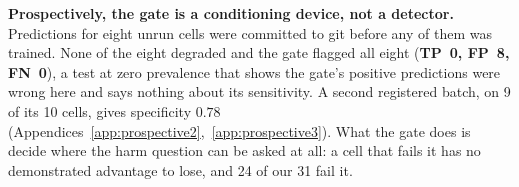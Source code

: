 \textbf{Prospectively, the gate is a conditioning device, not a detector.}
\label{sec:analysis:prospective}%
Predictions for eight unrun cells were committed to git before any of them was
trained.  None of the eight degraded and the gate flagged all eight
(\textbf{TP~0, FP~8, FN~0}), a test at zero prevalence that shows the gate's
positive predictions were wrong here and says nothing about its sensitivity.  A
second registered batch, on 9 of its 10 cells, gives specificity $0.78$
(Appendices~\ref{app:prospective2},~\ref{app:prospective3}).  What the gate does
is decide where the harm question can be asked at all: a cell that fails it has
no demonstrated advantage to lose, and 24 of our 31 fail it.
